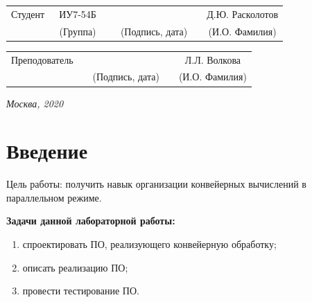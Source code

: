 \documentclass[12pt]{report}
\begin{document}
\begin{titlepage}
\noindent
{}
\\

\noindent
{}
\\

\vspace{1.5cm}
\noindent
\begin{tabular}{l c c c c c}
	Студент      & ~ИУ7-54Б~               & \hspace{3.5cm} & \hspace{2cm}                 & &  Д.Ю. Расколотов \\\cline{2-2}\cline{4-4} \cline{6-6} 
	\hspace{3cm} & {\footnotesize(Группа)} &                & {\footnotesize(Подпись, дата)} & & {\footnotesize(И.О. Фамилия)}
\end{tabular}

\noindent
\begin{tabular}{l c c c c}
	Преподователь & \hspace{6cm}   & \hspace{2cm}                 & & Л.Л. Волкова\\\cline{3-3} \cline{5-5} 
	\hspace{3cm}  &                & {\footnotesize(Подпись, дата)} & & {\footnotesize(И.О. Фамилия)}
\end{tabular}

\vspace{0.6cm}
\begin{center}	
	\vfill
	\large \textit {Москва, 2020}
\end{center}

\thispagestyle {empty}
\pagebreak
\end{titlepage}

\tableofcontents

\newpage
\chapter*{Введение}
Цель работы: получить навык организации конвейерных вычислений в параллельном режиме.
\begin{flushleft}
\textbf{Задачи данной лабораторной работы:}
\begin{enumerate}
	\item спроектировать ПО, реализующего конвейерную обработку;
	\item описать реализацию ПО;
	\item провести тестирование ПО.
\end{enumerate}
\end{flushleft}
\end{document}
